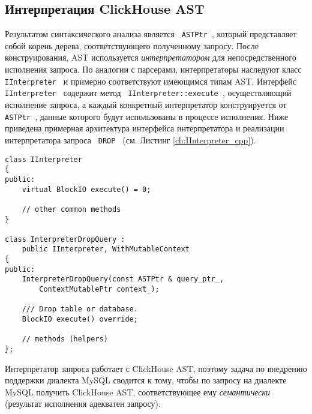 \subsection{Интерпретация ClickHouse AST}
Результатом синтаксического анализа является \texttt{ ASTPtr }, который представляет собой корень дерева, соответствующего полученному запросу. После конструирования, AST используется \textit{интерпретатором} для непосредственного исполнения запроса. По аналогии с парсерами, интерпретаторы наследуют класс \texttt{ IInterpreter } и примерно соответствуют имеющимся типам AST. Интерфейс \texttt{ IInterpreter } содержит метод \texttt{ IInterpreter::execute }, осуществляющий исполнение запроса, а каждый конкретный интерпретатор конструируется от \texttt{ ASTPtr }, данные которого будут использованы в процессе исполнения. Ниже приведена примерная архитектура интерфейса интерпретатора и реализации интерпретатора запроса \texttt{ DROP } (см. Листинг \ref{ch:IInterpreter_cpp}).
\begin{code}
    \label{ch:IInterpreter_cpp}
    \begin{verbatim}
class IInterpreter
{
public:
    virtual BlockIO execute() = 0;
    
    // other common methods
}

class InterpreterDropQuery : 
    public IInterpreter, WithMutableContext
{
public:
    InterpreterDropQuery(const ASTPtr & query_ptr_, 
        ContextMutablePtr context_);
    
    /// Drop table or database.
    BlockIO execute() override;

    // methods (helpers)
};
    \end{verbatim}
\end{code}

Интерпретатор запроса работает с ClickHouse AST, поэтому задача по внедрению поддержки диалекта MySQL сводится к тому, чтобы по запросу на диалекте MySQL получить ClickHouse AST, соответствующее ему \textit{семантически} (результат исполнения адекватен запросу). 
